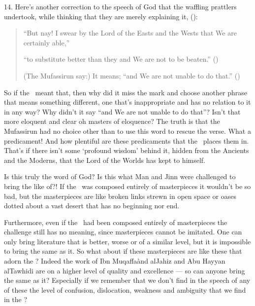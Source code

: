 \documentclass[12pt]{memoir}
\begin{document}

14. Here’s another correction to the speech of God
that the waffling prattlers undertook,
while thinking that they are merely explaining it, ():

\begin{quote}
“But nay! I swear by the Lord of the Easts and the Wests
that We are certainly able,”

“to substitute better than they and We are not to be beaten.”
()

(The Mufassirun say:) It means; “and We are not unable to do that.”
()
\end{quote}

So if the \Quran\ meant that, then why did it miss the mark
and choose another phrase that means something different,
one that’s inappropriate and has no relation to it in any way?
Why didn’t it say “and We are not unable to do that”?
Isn’t that more eloquent and clear oh masters of eloquence?
The truth is that the Mufassirun had no choice other than
to use this word to rescue the verse.
What a predicament!
And how plentiful are these predicaments that the \Quran\ places them in.
That’s if there isn’t some ‘profound wisdom’ behind it,
hidden from the Ancients and the Moderns,
that the Lord of the Worlds has kept to himself.

Is this truly the word of God?
Is this what Man and Jinn were challenged to bring the like of?!
If the \Quran\ was composed entirely of masterpieces it wouldn’t be so bad,
but the masterpieces are like broken links strewn in open space
or oases dotted about a vast desert that has no beginning nor end.

Furthermore, even if the \Quran\ had been composed entirely of masterpieces
the challenge still has no meaning, since masterpieces cannot be imitated.
One can only bring literature that is better, worse or of a similar level,
but it is impossible to bring the same as it.
So what about if these masterpieces are like these that adorn the \Quran?
Indeed the work of Ibn Muqaffa\` and al\–Jahiz
and Abu Hayyan al\–Tawhidi\fnmark{}
are on a higher level of quality and excellence —
so can anyone bring the same as it?
Especially if we remember that we don’t find in the speech
of any of these the level of confusion, dislocation,
weakness and ambiguity that we find in the \Quran?
\end{document}

